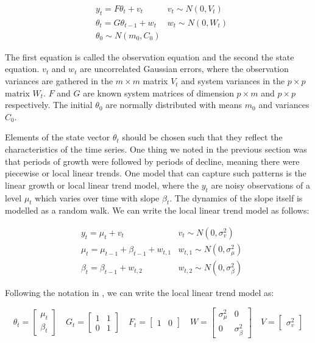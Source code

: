 \documentclass[12pt, a4paper]{article}
\begin{document}
\begin{align}
& y_{t} = F \theta_{t} + v_{t} & v_{t} \sim N(0, V_{t}) \\
& \theta_{t} = G \theta_{t-1} + w_{t} &w_{t} \sim N(0, W_{t}) \\
& \theta_{0} \sim N(m_{0}, C_{0})
\end{align}


The first equation is called the observation equation and the
second the state equation. $v_{t}$ and $w_{t}$ are
uncorrelated Gaussian errors, where the observation variances are
gathered in the $m \times m$ matrix $V_{t}$ and system variances in
the $p \times p$ matrix $W_{t}$. $F$ and $G$ are known system
matrices of dimension $p \times m$ and $p \times p$ respectively.
The initial $\theta_{0}$ are normally distributed with means $m_{0}$
and variances $C_{0}$.

Elements of the state vector $\theta_{t}$ should be
chosen such that they reflect the characteristics of the time series. One thing we noted in the previous section was that periods of growth were followed by periods of decline, meaning there were piecewise or local linear trends. One model that can capture such patterns is the linear growth or local linear trend model, where the
$y_{t}$ are noisy observations of a level $\mu_{t}$ which varies
over time with slope $\beta_{t}$. The dynamics of the slope itself is
modelled as a random walk. We can write the local linear trend model as
follows:


\begin{align}
& y_{t} = \mu_{t} + v_{t} & v_{t} \sim N(0, \sigma_{v}^{2}) \\
& \mu_{t} = \mu_{t-1} + \beta_{t-1} + w_{t,1} &w_{t,1} \sim N(0, \sigma_{\mu}^{2}) \\
& \beta_{t} = \beta_{t-1} + w_{t,2} &w_{t,2} \sim N(0, \sigma_{\beta}^{2})
\end{align}


Following the notation in \citet{petris2009dynamic}, we can write the local
linear trend model as:

\begin{equation*}
\theta_{t} = \begin{bmatrix} \mu_{t} \\ \beta_{t} \end{bmatrix} \quad 
G_{t} = \begin{bmatrix} 1 & 1 \\ 0 & 1 \end{bmatrix} \quad 
F_{t} = \begin{bmatrix} 1 & 0 \end{bmatrix} \quad
W = \begin{bmatrix} \sigma_{\mu}^{2} & 0 \\ 0 & \sigma_{\beta}^{2} \end{bmatrix} \quad
V = \begin{bmatrix} \sigma_{v}^{2} \end{bmatrix}
\end{equation*}
\end{document}
